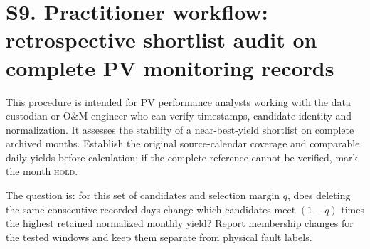 \documentclass[11pt]{article}
\begin{document}
\clearpage
\section*{S9. Practitioner workflow: retrospective shortlist audit on complete PV monitoring records}
This procedure is intended for PV performance analysts working with the data custodian or O\&M engineer who can verify timestamps, candidate identity and normalization. It assesses the stability of a near-best-yield shortlist on complete archived months. Establish the original source-calendar coverage and comparable daily yields before calculation; if the complete reference cannot be verified, mark the month \textsc{hold}.

The question is: for this set of candidates and selection margin $q$, does deleting the same consecutive recorded days change which candidates meet $(1-q)$ times the highest retained normalized monthly yield? Report membership changes for the tested windows and keep them separate from physical fault labels.
\end{document}
